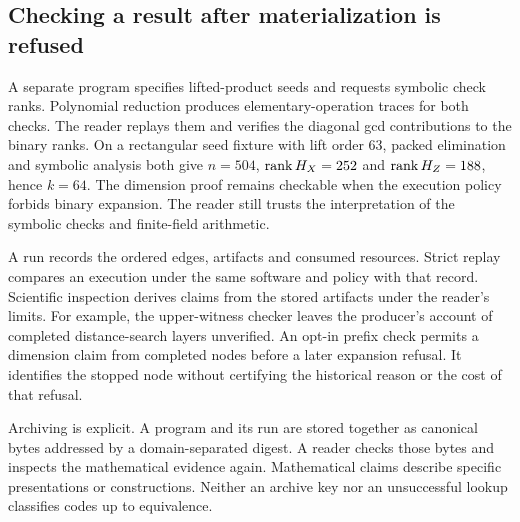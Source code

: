 \subsection{Checking a result after materialization is refused}
A separate program specifies lifted-product seeds and requests symbolic check
ranks. Polynomial reduction produces elementary-operation traces for both
checks. The reader replays them and verifies the diagonal gcd contributions to
the binary ranks. On a rectangular seed fixture with lift order 63, packed
elimination and symbolic analysis both give $n=504$, $\operatorname{rank} H_X=252$ and
$\operatorname{rank} H_Z=188$, hence $k=64$. The dimension proof remains checkable when the
execution policy forbids binary expansion. The reader still trusts the
interpretation of the symbolic checks and finite-field arithmetic.

A run records the ordered edges, artifacts and consumed resources. Strict
replay compares an execution under the same software and policy with that
record. Scientific inspection derives claims from the stored artifacts under
the reader's limits. For example, the upper-witness checker leaves the
producer's account of completed distance-search layers unverified. An opt-in
prefix check permits a dimension claim from completed nodes before a later
expansion refusal. It identifies the stopped node without certifying the
historical reason or the cost of that refusal.

Archiving is explicit. A program and its run are stored together as canonical
bytes addressed by a domain-separated digest. A reader checks those bytes
and inspects the mathematical evidence again. Mathematical claims describe
specific presentations or constructions. Neither an archive key nor an
unsuccessful lookup classifies codes up to equivalence.
